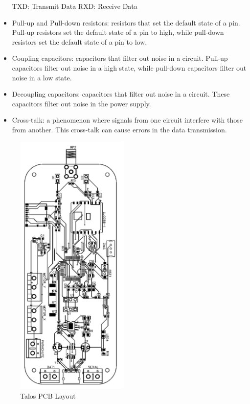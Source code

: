 \documentclass{article}
\begin{document}
\begin{itemize}
            \subitem TXD: Transmit Data
            \subitem RXD: Receive Data
      \item Pull-up and Pull-down resistors: resistors that set the default state of a pin. Pull-up resistors set the default state of a pin to high, while pull-down resistors set the default state of a pin to low.
      \item Coupling capacitors: capacitors that filter out noise in a circuit. Pull-up capacitors filter out noise in a high state, while pull-down capacitors filter out noise in a low state.
      \item Decoupling capacitors: capacitors that filter out noise in a circuit. These capacitors filter out noise in the power supply.
      \item Cross-talk: a phenomenon where signals from one circuit interfere with those from another. This cross-talk can cause errors in the data transmission.
\end{itemize}
\begin{figure}[h!]
      \caption{Talos PCB Layout}
      \label{fig:talos_pcb_layout}
      \centering
      \includegraphics[width=0.5\textwidth]{PCB.png}
\end{figure}
\end{document}
